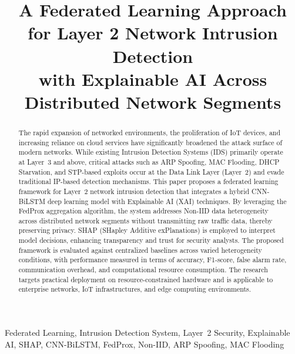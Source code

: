 \documentclass[conference]{IEEEtran}
\begin{document}
\title{A Federated Learning Approach for Layer 2 Network Intrusion Detection\\
with Explainable AI Across Distributed Network Segments}

\author{
}

\maketitle

\begin{abstract}
The rapid expansion of networked environments, the proliferation of IoT devices, and
increasing reliance on cloud services have significantly broadened the attack surface of
modern networks. While existing Intrusion Detection Systems (IDS) primarily operate at
Layer~3 and above, critical attacks such as ARP Spoofing, MAC Flooding, DHCP Starvation,
and STP-based exploits occur at the Data Link Layer (Layer~2) and evade traditional
IP-based detection mechanisms. This paper proposes a federated learning framework for
Layer~2 network intrusion detection that integrates a hybrid CNN-BiLSTM deep learning
model with Explainable AI (XAI) techniques. By leveraging the FedProx aggregation
algorithm, the system addresses Non-IID data heterogeneity across distributed network
segments without transmitting raw traffic data, thereby preserving privacy. SHAP
(SHapley Additive exPlanations) is employed to interpret model decisions, enhancing
transparency and trust for security analysts. The proposed framework is evaluated against
centralized baselines across varied heterogeneity conditions, with performance measured in
terms of accuracy, F1-score, false alarm rate, communication overhead, and computational
resource consumption. The research targets practical deployment on resource-constrained
hardware and is applicable to enterprise networks, IoT infrastructures, and edge
computing environments.
\end{abstract}

\begin{IEEEkeywords}
Federated Learning, Intrusion Detection System, Layer~2 Security, Explainable AI,
SHAP, CNN-BiLSTM, FedProx, Non-IID, ARP Spoofing, MAC Flooding
\end{IEEEkeywords}
\end{document}
